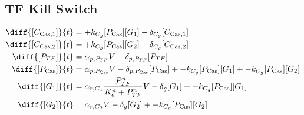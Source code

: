\subsection{TF Kill Switch}
\label{s:TF_delayed_kill_switch}

\begin{align}
\diff{\conc{\cplx{\cas}{1}}}{t} & =  + \gRnaBind{}\conc{\proSp{\cas{}}}\conc{\gRna{1}} - \casCompDegradeRate{}\conc{\cplx{\cas}{1}}\\ 
\diff{\conc{\cplx{\cas}{2}}}{t} & =  + \gRnaBind{}\conc{\proSp{\cas{}}}\conc{\gRna{2}} - \casCompDegradeRate{}\conc{\cplx{\cas}{2}}\\ 
\diff{\conc{\proSp{TF}}}{t} & =  \txtlRate{\proSp{TF}}\vectorGen{} - \proDegradeRate{\proSp{TF}}\conc{\proSp{TF}}\\ 
\diff{\conc{\proSp{\cas{}}}}{t} & =  \txtlRate{\proSp{\cas{}}}\vectorGen{} - \proDegradeRate{\proSp{\cas{}}}\conc{\proSp{\cas{}}} + - \gRnaBind{}\conc{\proSp{\cas{}}}\conc{\gRna{1}} + - \gRnaBind{}\conc{\proSp{\cas{}}}\conc{\gRna{2}}\\ 
\diff{\conc{\gRna{1}}}{t} & =  \txRate{\gRna{1}}\frac{\proSp{TF}^n}{K_a^n + \proSp{TF}^n}\vectorGen{} - \rnaDegradeRate{}\conc{\gRna{1}} + - \gRnaBind{}\conc{\proSp{\cas{}}}\conc{\gRna{1}}\\ 
\diff{\conc{\gRna{2}}}{t} & =  \txRate{\gRna{2}}\vectorGen{} - \rnaDegradeRate{}\conc{\gRna{2}} + - \gRnaBind{}\conc{\proSp{\cas{}}}\conc{\gRna{2}}
\end{align}

